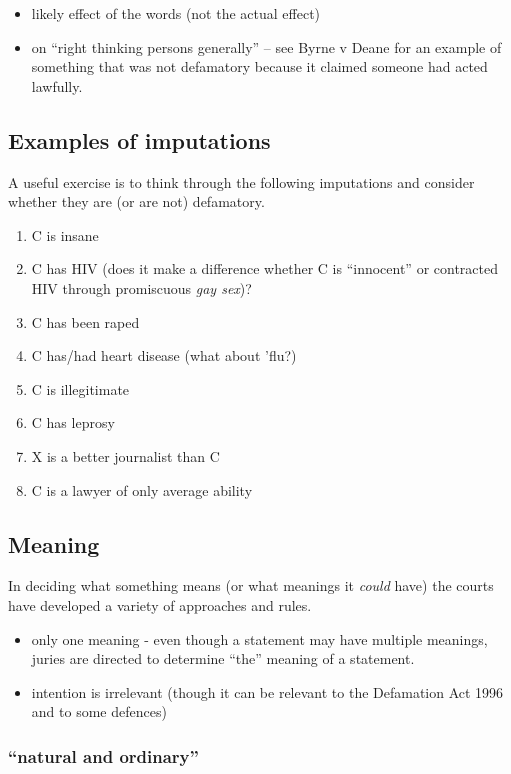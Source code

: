 \documentclass[]{article}
\begin{document}
\begin{itemize}
\item
  likely effect of the words (not the actual effect)
\item
  on ``right thinking persons generally'' -- see Byrne v Deane for an
  example of something that was not defamatory because it claimed
  someone had acted lawfully.
\end{itemize}

\subsection{Examples of imputations}

A useful exercise is to think through the following imputations and
consider whether they are (or are not) defamatory.

\begin{enumerate}
\item
  C is insane
\item
  {C has HIV (does it make a difference whether C is ``innocent'' or
  contracted HIV through promiscuous }\emph{{gay sex}}{{)?}}
\item
  C has been raped
\item
  C has/had heart disease (what about 'flu?)
\item
  C is illegitimate
\item
  C has leprosy
\item
  X is a better journalist than C
\item
  C is a lawyer of only average ability
\end{enumerate}

\subsection{Meaning}

{In deciding what something means (or what meanings it }\emph{{could
}}{{have) the courts have developed a variety of approaches and rules.}}

\begin{itemize}
\item
  only one meaning - even though a statement may have multiple meanings,
  juries are directed to determine ``the'' meaning of a statement.
\item
  intention is irrelevant (though it can be relevant to the Defamation
  Act 1996 and to some defences)
\end{itemize}

\subsubsection{\texorpdfstring{``natural and
ordinary''}{natural and ordinary}}
\end{document}
